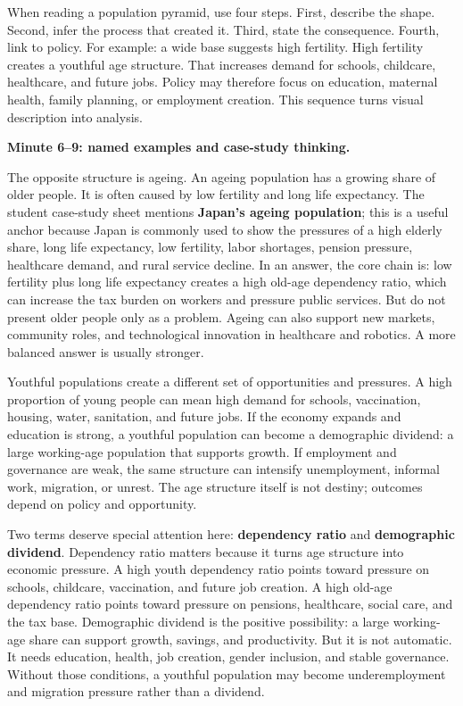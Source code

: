 \documentclass[11pt,a4paper]{article}
\newcommand{\term}[1]{\textcolor{HeadingBlue}{\textbf{#1}}}
\begin{document}
When reading a population pyramid, use four steps. First, describe the shape.
Second, infer the process that created it. Third, state the consequence. Fourth,
link to policy. For example: a wide base suggests high fertility. High fertility
creates a youthful age structure. That increases demand for schools, childcare,
healthcare, and future jobs. Policy may therefore focus on education, maternal
health, family planning, or employment creation. This sequence turns visual
description into analysis.

\textbf{Minute 6--9: named examples and case-study thinking.}

The opposite structure is ageing. An ageing population has a growing share of
older people. It is often caused by low fertility and long life expectancy. The
student case-study sheet mentions \term{Japan's ageing population}; this is a
useful anchor because Japan is commonly used to show the pressures of a high
elderly share, long life expectancy, low fertility, labor shortages, pension
pressure, healthcare demand, and rural service decline. In an answer, the core
chain is: low fertility plus long life expectancy creates a high old-age
dependency ratio, which can increase the tax burden on workers and pressure
public services. But do not present older people only as a problem. Ageing can
also support new markets, community roles, and technological innovation in
healthcare and robotics. A more balanced answer is usually stronger.

Youthful populations create a different set of opportunities and pressures. A
high proportion of young people can mean high demand for schools, vaccination,
housing, water, sanitation, and future jobs. If the economy expands and education
is strong, a youthful population can become a demographic dividend: a large
working-age population that supports growth. If employment and governance are
weak, the same structure can intensify unemployment, informal work, migration,
or unrest. The age structure itself is not destiny; outcomes depend on policy
and opportunity.

Two terms deserve special attention here: \term{dependency ratio} and
\term{demographic dividend}. Dependency ratio matters because it turns age
structure into economic pressure. A high youth dependency ratio points toward
pressure on schools, childcare, vaccination, and future job creation. A high
old-age dependency ratio points toward pressure on pensions, healthcare, social
care, and the tax base. Demographic dividend is the positive possibility: a
large working-age share can support growth, savings, and productivity. But it is
not automatic. It needs education, health, job creation, gender inclusion, and
stable governance. Without those conditions, a youthful population may become
underemployment and migration pressure rather than a dividend.
\end{document}
